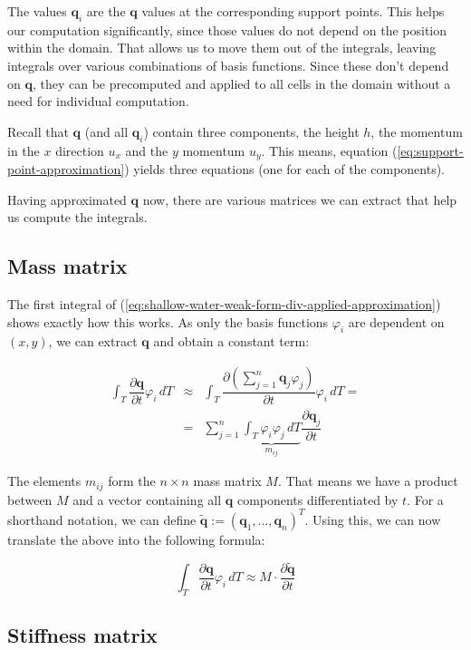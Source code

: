 \documentclass[a4paper, twoside]{article}
\newcommand{\pd}[2]{\dfrac{\partial #1}{\partial #2}}
\renewcommand{\phi}{\varphi}
\begin{document}
The values $\mathbf{q}_i$ are the $\mathbf{q}$ values at the corresponding support points. This helps our computation significantly, since those values do not depend on the position within the domain. That allows us to move them out of the integrals, leaving integrals over various combinations of basis functions. Since these don't depend on $\mathbf{q}$, they can be precomputed and applied to all cells in the domain without a need for individual computation.

Recall that $\mathbf{q}$ (and all $\mathbf{q}_i$) contain three components, the height $h$, the momentum in the $x$ direction $u_x$ and the $y$ momentum $u_y$. This means, equation (\ref{eq:support-point-approximation}) yields three equations (one for each of the components).

Having approximated $\mathbf{q}$ now, there are various matrices we can extract that help us compute the integrals.

\subsection{Mass matrix}
\label{sec:mass-matrix}

The first integral of (\ref{eq:shallow-water-weak-form-div-applied-approximation}) shows exactly how this works. As only the basis functions $\phi_i$ are dependent on $(x,y)$, we can extract $\mathbf{q}$ and obtain a constant term:

\begin{eqnarray*}
  \int_T \pd {\mathbf{q}}{t} \phi_i \, dT & \approx &
  \int_T \pd {\left( \sum_{j=1}^n \mathbf{q}_j \phi_j \right) }{t} \phi_i \, dT = \\
  & = & \sum_{j=1}^n \underbrace{\int_T \phi_i \phi_j \, dT}_{m_{ij}} \pd{\mathbf{q}_j}{t}
\end{eqnarray*}

The elements $m_{ij}$ form the $n \times n$ mass matrix $M$. That means we have a product between $M$ and a vector containing all $\mathbf{q}$ components differentiated by $t$. For a shorthand notation, we can define $\tilde{\mathbf{q}} := \left( \mathbf{q}_1 , \dots , \mathbf{q}_n \right)^T$. Using this, we can now translate the above into the following formula:

\begin{equation*}
  \int_T \pd {\mathbf{q}}{t} \phi_i \, dT \approx
  M \cdot \pd{
    \tilde{\mathbf{q}}}{t}
\end{equation*}

\subsection{Stiffness matrix}
\label{sec:stiffness-matrix}
\end{document}
